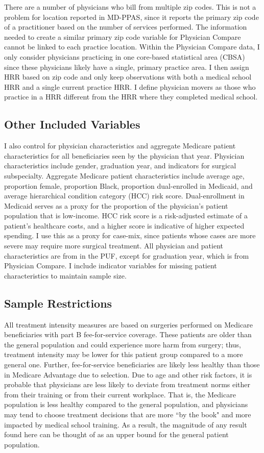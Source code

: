 There are a number of physicians who bill from multiple zip codes. This is not a problem for location reported in MD-PPAS, since it reports the primary zip code of a practitioner based on the number of services performed. The information needed to create a similar primary zip code variable for Physician Compare cannot be linked to each practice location. Within the Physician Compare data, I only consider physicians practicing in one core-based statistical area (CBSA) since these physicians likely have a single, primary practice area. I then assign HRR based on zip code and only keep observations with both a medical school HRR and a single current practice HRR. I define physician movers as those who practice in a HRR different from the HRR where they completed medical school.

\subsection{Other Included Variables}
I also control for physician characteristics and aggregate Medicare patient characteristics for all beneficiaries seen by the physician that year. Physician characteristics include gender, graduation year, and indicators for surgical subspecialty. Aggregate Medicare patient characteristics include average age, proportion female, proportion Black, proportion dual-enrolled in Medicaid, and average hierarchical condition category (HCC) risk score. Dual-enrollment in Medicaid serves as a proxy for the proportion of the physician's patient population that is low-income. HCC risk score is a risk-adjusted estimate of a patient's healthcare costs, and a higher score is indicative of higher expected spending. I use this as a proxy for case-mix, since patients whose cases are more severe may require more surgical treatment. All physician and patient characteristics are from in the PUF, except for graduation year, which is from Physician Compare. I include indicator variables for missing patient characteristics to maintain sample size.



\subsection{Sample Restrictions}
All treatment intensity measures are based on surgeries performed on Medicare beneficiaries with part B fee-for-service coverage. These patients are older than the general population and could experience more harm from surgery; thus, treatment intensity may be lower for this patient group compared to a more general one. Further, fee-for-service beneficiaries are likely less healthy than those in Medicare Advantage due to selection. Due to age and other risk factors, it is probable that physicians are less likely to deviate from treatment norms either from their training or from their current workplace. That is, the Medicare population is less healthy compared to the general population, and physicians may tend to choose treatment decisions that are more ``by the book" and more impacted by medical school training. As a result, the magnitude of any result found here can be thought of as an upper bound for the general patient population.
